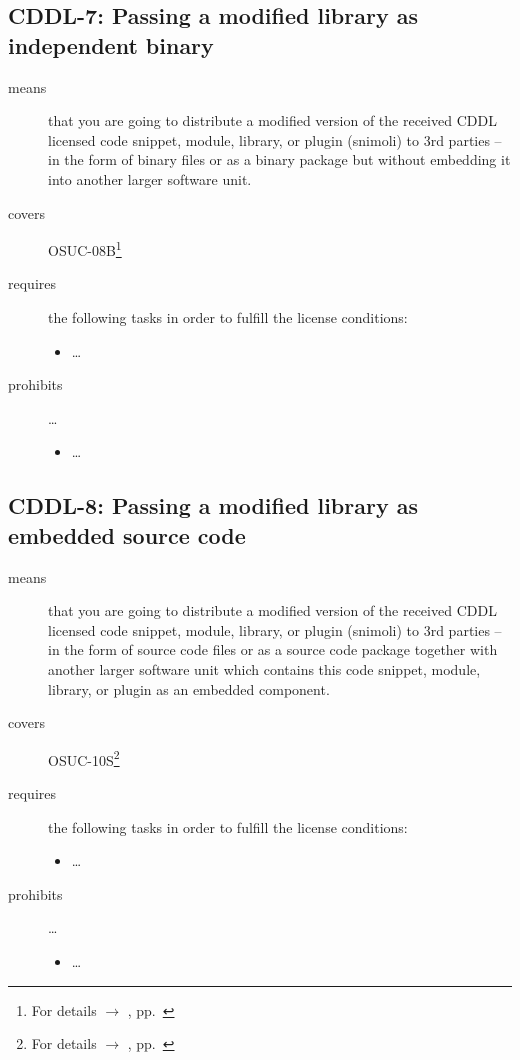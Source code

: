 \subsection{CDDL-7: Passing a modified library as independent binary}
\label{OSUC-08B-CDDL}

\begin{description}
\item[means] that you are going to distribute a modified version of the received
CDDL licensed code snippet, module, library, or plugin (snimoli) to 3rd parties
-- in the form of binary files or as a binary package but without embedding it
into another larger software unit.
\item[covers] OSUC-08B\footnote{For details $\rightarrow$ \oslic, pp.\
\pageref{OSUC-08B-DEF}}
\item[requires] the following tasks in order to fulfill the license conditions:
\begin{itemize}
  
  \item \ldots
  
\end{itemize}

\item[prohibits] \ldots
\begin{itemize}
  \item \ldots
\end{itemize}
\end{description}

\subsection{CDDL-8: Passing a modified library as embedded source code}
\label{OSUC-10S-CDDL}

\begin{description}
\item[means] that you are going to distribute a modified version of the received
CDDL licensed code snippet, module, library, or plugin (snimoli) to 3rd parties
-- in the form of source code files or as a source code package together with
another larger software unit which contains this code snippet, module, library,
or plugin as an embedded component.
\item[covers] OSUC-10S\footnote{For details $\rightarrow$ \oslic, pp.\
\pageref{OSUC-10S-DEF}}
\item[requires] the following tasks in order to fulfill the license conditions:
\begin{itemize}
  
  \item \ldots
  
\end{itemize}

\item[prohibits] \ldots
\begin{itemize}
  \item \ldots
\end{itemize}
\end{description}

